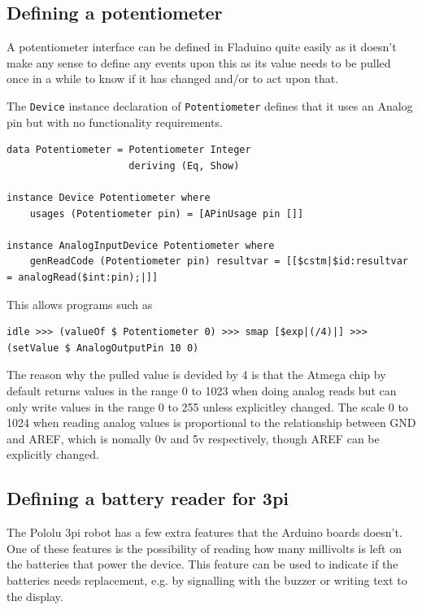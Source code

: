 \documentclass[a4paper, oneside, final]{memoir}
\begin{document}
\subsection{Defining a potentiometer}

A potentiometer interface can be defined in Fladuino quite easily as it doesn't
make any sense to define any events upon this as its value needs to be pulled
once in a while to know if it has changed and/or to act upon that.

The \texttt{Device} instance declaration of \texttt{Potentiometer} defines that
it uses an Analog pin but with no functionality requirements.

\begin{verbatim}
data Potentiometer = Potentiometer Integer
                     deriving (Eq, Show)

instance Device Potentiometer where
    usages (Potentiometer pin) = [APinUsage pin []]

instance AnalogInputDevice Potentiometer where
    genReadCode (Potentiometer pin) resultvar = [[$cstm|$id:resultvar = analogRead($int:pin);|]]
\end{verbatim}

This allows programs such as

\begin{verbatim}
idle >>> (valueOf $ Potentiometer 0) >>> smap [$exp|(/4)|] >>> (setValue $ AnalogOutputPin 10 0)
\end{verbatim}

The reason why the pulled value is devided by 4 is that the Atmega
chip by default returns values in the range 0 to 1023 when doing
analog reads but can only write values in the range 0 to 255 unless
explicitley changed. The scale 0 to 1024 when reading analog values is
proportional to the relationship between GND and AREF, which is
nomally 0v and 5v respectively, though AREF can be explicitly changed.

\subsection{Defining a battery reader for 3pi}

The Pololu 3pi robot has a few extra features that the Arduino boards
doesn't. One of these features is the possibility of reading how many millivolts
is left on the batteries that power the device. This feature can be used to
indicate if the batteries needs replacement, e.g. by signalling with the buzzer
or writing text to the display.
\end{document}

